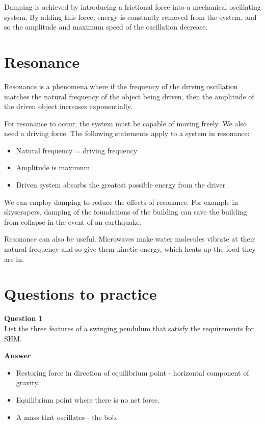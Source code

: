 \documentclass{article}
\begin{document}
Damping is achieved by introducing a frictional force into a mechanical oscillating system. By adding this force, energy is constantly removed from the system, and so the amplitude and maximum speed of the oscillation decrease.

\section*{Resonance}
Resonance is a phenomena where if the frequency of the driving oscillation matches the natural frequency of the object being driven, then the amplitude of the driven object increases exponentially.

For resonance to occur, the system must be capable of moving freely. We also need a driving force. The following statements apply to a system in resonance:
\begin{itemize}
	\item Natural frequency = driving frequency
	\item Amplitude is maximum
	\item Driven system absorbs the greatest possible energy from the driver
\end{itemize}

We can employ damping to reduce the effects of resonance. For example in skyscrapers, damping of the foundations of the building can save the building from collapse in the event of an earthquake.

Resonance can also be useful. Microwaves make water molecules vibrate at their natural frequency and so give them kinetic energy, which heats up the food they are in.

\section*{Questions to practice}
\textbf{Question 1}\\
List the three features of a swinging pendulum that satisfy the requirements for SHM.

\textbf{Answer}\\
\begin{itemize}
	\item Restoring force in direction of equilibrium point - horizontal component of gravity.
	\item Equilibrium point where there is no net force.
	\item A mass that oscillates - the bob.
\end{itemize}
\end{document}
